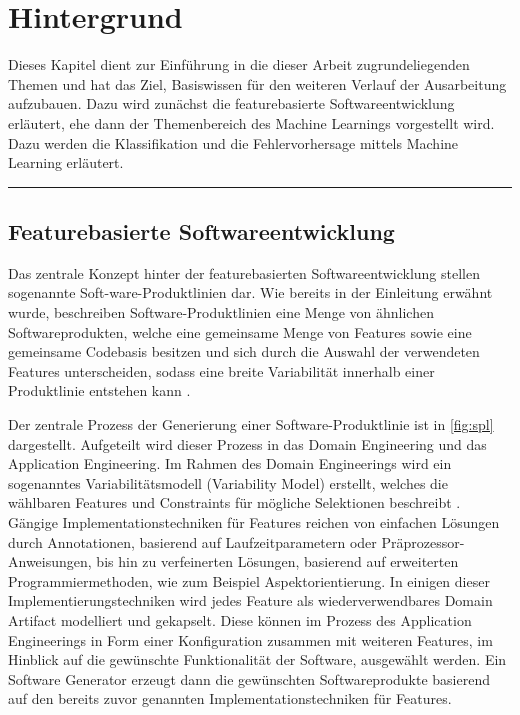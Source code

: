 
\chapter{Hintergrund}
\label{background}

Dieses Kapitel dient zur Einführung in die dieser Arbeit zugrundeliegenden Themen und hat das Ziel, Basiswissen für den weiteren Verlauf der Ausarbeitung aufzubauen. Dazu wird zunächst die featurebasierte Softwareentwicklung erläutert, ehe dann der Themenbereich des Machine Learnings vorgestellt wird. Dazu werden die Klassifikation und die Fehlervorhersage mittels Machine Learning erläutert.
\\
\hrule

\section{Featurebasierte Softwareentwicklung}
\label{feat-develop}

Das zentrale Konzept hinter der featurebasierten Softwareentwicklung stellen sogenannte Soft-ware-Produktlinien dar. Wie bereits in der Einleitung erwähnt wurde, beschreiben Software-Produktlinien eine Menge von ähnlichen Softwareprodukten, welche eine gemeinsame Menge von Features sowie eine gemeinsame Codebasis besitzen und sich durch die Auswahl der verwendeten Features unterscheiden, sodass eine breite Variabilität innerhalb einer Produktlinie entstehen kann \cite{Apel2013,Thuem2014}.

Der zentrale Prozess der Generierung einer Software-Produktlinie ist in \autoref{fig:spl} dargestellt. Aufgeteilt wird dieser Prozess in das \glqq Domain Engineering\grqq{} und das \glqq Application Engineering\grqq{}. Im Rahmen des \glqq Domain Engineerings\grqq{} wird ein sogenanntes Variabilitätsmodell (Variability Model) erstellt, welches die wählbaren Features und Constraints für mögliche Selektionen beschreibt \cite{Apel2013}. Gängige Implementationstechniken für Features reichen von einfachen Lösungen durch Annotationen, basierend auf Laufzeitparametern oder Präprozessor-Anweisungen, bis hin zu verfeinerten Lösungen, basierend auf erweiterten Programmiermethoden, wie zum Beispiel Aspektorientierung. In einigen dieser Implementierungstechniken wird jedes Feature als wiederverwendbares \glqq Domain Artifact\grqq{} modelliert und gekapselt. Diese können im Prozess des \glqq Application Engineerings\grqq{} in Form einer Konfiguration zusammen mit weiteren Features, im Hinblick auf die gewünschte Funktionalität der Software, ausgewählt werden. Ein Software Generator erzeugt dann die gewünschten Softwareprodukte basierend auf den bereits zuvor genannten Implementationstechniken für Features.

